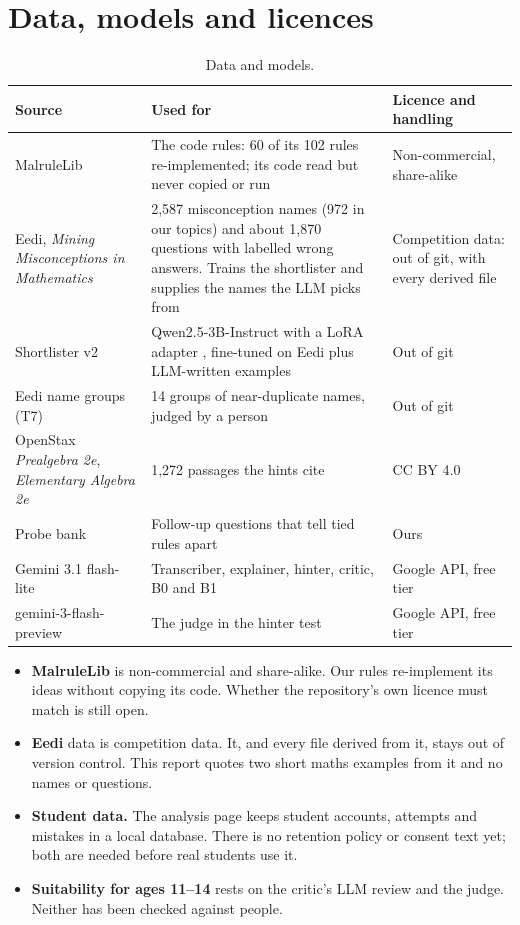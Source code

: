 \documentclass[11pt,a4paper]{article}
\begin{document}
\clearpage
\appendix
\section{Data, models and licences}\label{app:data}
\begin{table}[H]
\centering\small
\begin{tabularx}{\linewidth}{@{}P{3.6cm}YP{3.7cm}@{}}
\toprule
Source & Used for & Licence and handling \\
\midrule
MalruleLib \cite{malrulelib} & The code rules: 60 of its 102 rules re-implemented; its code read but never copied or run & Non-commercial, share-alike \\
Eedi, \emph{Mining Misconceptions in Mathematics} \cite{eedi} & 2,587 misconception names (972 in our topics) and about 1,870 questions with labelled wrong answers. Trains the shortlister and supplies the names the LLM picks from & Competition data: out of git, with every derived file \\
Shortlister v2 & Qwen2.5-3B-Instruct \cite{qwen25} with a LoRA adapter \cite{lora}, fine-tuned on Eedi plus LLM-written examples & Out of git \\
Eedi name groups (T7) & 14 groups of near-duplicate names, judged by a person & Out of git \\
OpenStax \emph{Prealgebra 2e}, \emph{Elementary Algebra 2e} \cite{openstax-pre,openstax-alg} & 1,272 passages the hints cite & CC BY 4.0 \\
Probe bank & Follow-up questions that tell tied rules apart & Ours \\
Gemini 3.1 flash-lite & Transcriber, explainer, hinter, critic, B0 and B1 & Google API, free tier \\
gemini-3-flash-preview & The judge in the hinter test & Google API, free tier \\
\bottomrule
\end{tabularx}
\caption{Data and models.}
\end{table}
\begin{itemize}
  \item \textbf{MalruleLib} is non-commercial and share-alike. Our rules re-implement its ideas without copying its code. Whether the repository's own licence must match is still open.
  \item \textbf{Eedi} data is competition data. It, and every file derived from it, stays out of version control. This report quotes two short maths examples from it and no names or questions.
  \item \textbf{Student data.} The analysis page keeps student accounts, attempts and mistakes in a local database. There is no retention policy or consent text yet; both are needed before real students use it.
  \item \textbf{Suitability for ages 11--14} rests on the critic's LLM review and the judge. Neither has been checked against people.
\end{itemize}
\end{document}

